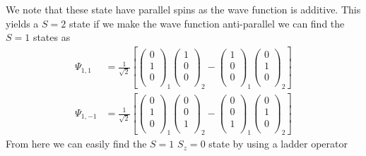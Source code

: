 \documentclass[11pt]{article}
\numberwithin{equation}{section}
\begin{document}
We note that these state have parallel spins as the wave function is additive. This yields
a $S=2$ state if we make the wave function anti-parallel we can find the $S=1$ states as
\begin{align*}
\Psi_{1,1} &= \frac{1}{\sqrt{2}}\left[\left(\begin{array}{c} 0\\ 1\\ 0\\\end{array}\right)_{1}\left(\begin{array}{c} 1\\ 0\\ 0\\\end{array}\right)_{2} -
\left(\begin{array}{c} 1\\ 0\\ 0\\\end{array}\right)_{1}\left(\begin{array}{c} 0\\ 1\\ 0\\\end{array}\right)_{2}\right]\\
\Psi_{1,-1} &= \frac{1}{\sqrt{2}}\left[\left(\begin{array}{c} 0\\ 1\\ 0\\\end{array}\right)_{1}\left(\begin{array}{c} 0\\ 0\\ 1\\\end{array}\right)_{2} -
\left(\begin{array}{c} 0\\ 0\\ 1\\\end{array}\right)_{1}\left(\begin{array}{c} 0\\ 1\\ 0\\\end{array}\right)_{2}\right]
\end{align*}
From here we can easily find the $S=1$ $S_z=0$ state by using a ladder operator
\end{document}
